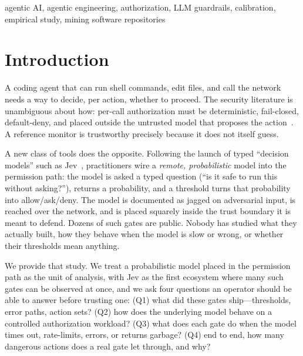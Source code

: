 \documentclass[conference]{IEEEtran}
\begin{document}
\begin{IEEEkeywords}
agentic AI, agentic engineering, authorization, LLM guardrails, calibration,
empirical study, mining software repositories
\end{IEEEkeywords}

\section{Introduction}
A coding agent that can run shell commands, edit files, and call the network needs a way to
decide, per action, whether to proceed. The security literature is unambiguous about how:
per-call authorization must be deterministic, fail-closed, default-deny, and placed outside
the untrusted model that proposes the action~\cite{saltzer1975,scopegate2026,agentspec2026}.
A reference monitor is trustworthy precisely because it does not itself guess.

A new class of tools does the opposite. Following the launch of typed ``decision models''
such as Jev~\cite{jevdocs}, practitioners wire a \emph{remote, probabilistic} model into the
permission path: the model is asked a typed question (``is it safe to run this without
asking?''), returns a probability, and a threshold turns that probability into
allow/ask/deny. The model is documented as jagged on adversarial input, is reached over the
network, and is placed squarely inside the trust boundary it is meant to defend. Dozens of
such gates are public. Nobody has studied what they actually built, how they behave when the
model is slow or wrong, or whether their thresholds mean anything.

We provide that study. We treat a probabilistic model placed in the permission path as the
unit of analysis, with Jev as the first ecosystem where many such gates can be observed at
once, and we ask four questions an operator should be able to answer before trusting one:
(Q1) what did these gates ship---thresholds, error paths, action sets? (Q2) how does the
underlying model behave on a controlled authorization workload? (Q3) what does each gate do
when the model times out, rate-limits, errors, or returns garbage? (Q4) end to end, how many
dangerous actions does a real gate let through, and why?
\end{document}
